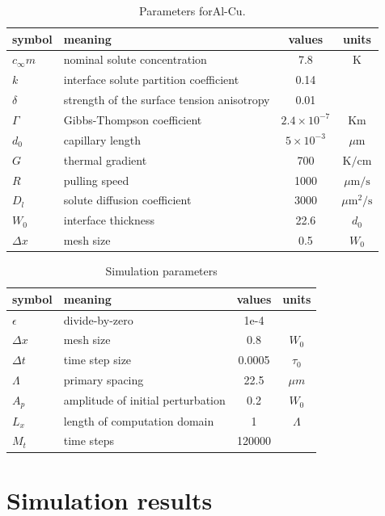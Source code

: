 \documentclass[a4paper,12pt]{article}
\begin{document}
\begin{table}
\centering
\caption{Parameters forAl-Cu.}
\begin{tabular}{l l c c }
\toprule
symbol & meaning & values & units \\
\midrule
$c_{\infty}m$ & nominal solute concentration &  7.8 & K \\
$k$ & interface solute partition coefficient & 0.14 &\\
$\delta$ & strength of the surface tension anisotropy  &  0.01  &\\
$\Gamma$ & Gibbs-Thompson coefficient & $2.4\times 10^{-7}$ & Km \\
$d_0$ & capillary length & $ 5\times10^{-3}$  & $\mu$m \\
$G$ & thermal gradient & 700 & $\text{K} / \text{cm}$ \\
$R$ & pulling speed &  1000 & $\mu \text{m} / \text{s}$ \\
$D_l$ & solute diffusion coefficient &$3000$ &  ${\mu\text{m}}^2/\text{s}$ \\
$W_0$ & interface thickness  & 22.6  & $d_0$ \\
$\Delta x$ & mesh size & 0.5 & $W_0$ \\
\bottomrule
\end{tabular}\label{tab:SCN}

\end{table}


\begin{table}
\centering
\caption{Simulation parameters}
\begin{tabular}{l l c c }
\toprule
symbol & meaning & values & units \\
\midrule
$\epsilon$ & divide-by-zero  & 1e-4  &\\
$\Delta x$ & mesh size & 0.8 & $W_0$ \\
$\Delta t$ & time step size& 0.0005& $\tau_0$ \\
$\Lambda$ & primary spacing & 22.5 & $\mu m$ \\
$A_p$ & amplitude of initial perturbation& 0.2 & $W_0$\\
$L_x$ & length of computation domain  &  1  & $\Lambda$\\
$M_t$ & time steps& 120000 & \\
\bottomrule
\end{tabular}
\end{table}

\section{Simulation results}
\end{document}
